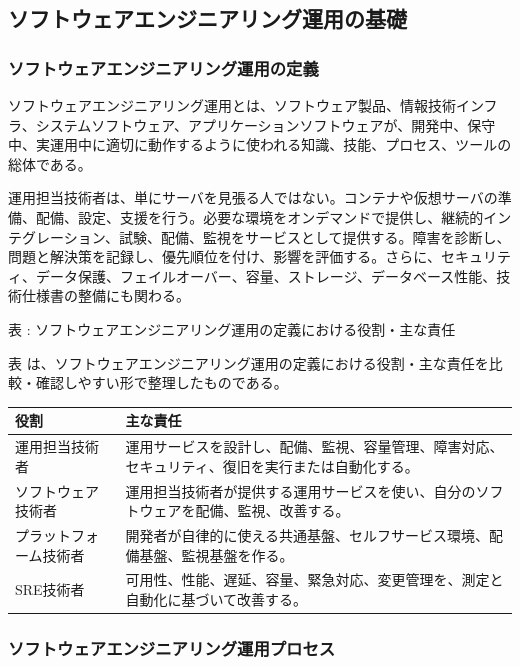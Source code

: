 \subsection{ソフトウェアエンジニアリング運用の基礎}

\subsubsection{ソフトウェアエンジニアリング運用の定義}

ソフトウェアエンジニアリング運用とは、ソフトウェア製品、情報技術インフラ、システムソフトウェア、アプリケーションソフトウェアが、開発中、保守中、実運用中に適切に動作するように使われる知識、技能、プロセス、ツールの総体である。

運用担当技術者は、単にサーバを見張る人ではない。コンテナや仮想サーバの準備、配備、設定、支援を行う。必要な環境をオンデマンドで提供し、継続的インテグレーション、試験、配備、監視をサービスとして提供する。障害を診断し、問題と解決策を記録し、優先順位を付け、影響を評価する。さらに、セキュリティ、データ保護、フェイルオーバー、容量、ストレージ、データベース性能、技術仕様書の整備にも関わる。

\par\smallskip\noindent{}\label{tab:ch06-02}表 \thetable: ソフトウェアエンジニアリング運用の定義における役割・主な責任\par\smallskip
表 \thetable は、ソフトウェアエンジニアリング運用の定義における役割・主な責任を比較・確認しやすい形で整理したものである。\par\smallskip
\begin{longtable}{L{45mm}L{105mm}}
\toprule
役割 & 主な責任 \\
\midrule
運用担当技術者 & 運用サービスを設計し、配備、監視、容量管理、障害対応、セキュリティ、復旧を実行または自動化する。 \\
ソフトウェア技術者 & 運用担当技術者が提供する運用サービスを使い、自分のソフトウェアを配備、監視、改善する。 \\
プラットフォーム技術者 & 開発者が自律的に使える共通基盤、セルフサービス環境、配備基盤、監視基盤を作る。 \\
SRE技術者 & 可用性、性能、遅延、容量、緊急対応、変更管理を、測定と自動化に基づいて改善する。 \\
\bottomrule
\end{longtable}

\subsubsection{ソフトウェアエンジニアリング運用プロセス}

